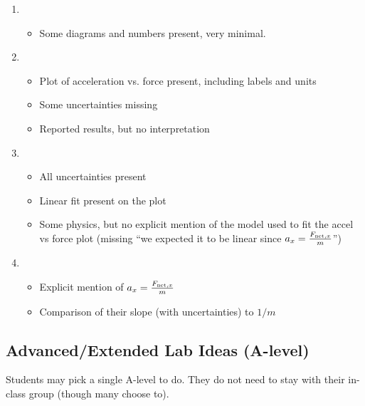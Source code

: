 \documentclass[fleqn,letterpaper]{article}
\begin{document}
\begin{enumerate}
 \item{
  \begin{itemize}
   \item{Some diagrams and numbers present, very minimal.}
  \end{itemize}
}
 \item{
  \begin{itemize}
   \item{Plot of acceleration vs. force present, including labels and units}
   \item{Some uncertainties missing}
   \item{Reported results, but no interpretation}
  \end{itemize}
}
 \item{
  \begin{itemize}
   \item{All uncertainties present}
   \item{Linear fit present on the plot}
   \item{Some physics, but no explicit mention of the model used to fit the accel vs force plot (missing ``we expected it to be linear since $a_x = \frac{F_{{\rm net},x}}{m}$'')}
  \end{itemize}
}
 \item{
  \begin{itemize}
   \item{Explicit mention of $a_x = \frac{F_{{\rm net},x}}{m}$}
   \item{Comparison of their slope (with uncertainties) to $1/m$}
  \end{itemize}
}
\end{enumerate}


\subsection*{Advanced/Extended Lab Ideas (A-level)}

Students may pick a single A-level to do.  They do not need to stay with their in-class group (though many choose to).
\end{document}
